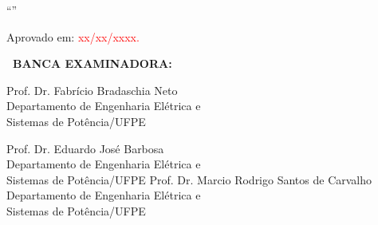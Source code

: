 
\thispagestyle{empty}
\begin{center}


    \textbf{{\ABNTEXchapterfont\fontsize{12}{12}\selectfont\imprimirautor}}
	
    \vspace{0.5cm}
    \begin{center}
      ``\ABNTEXchapterfont\fontsize{12}{12}\selectfont\imprimirtitulo''
    \end{center}
    \vspace{0.5cm}
	

      \hspace{.20\textwidth}
      \begin{minipage}{.55\textwidth}
      	\SingleSpacing
         \imprimirpreambuloatadefesa
       \end{minipage}%
       
    \vspace{0.5cm}
    \begin{flushleft}
    {\fontsize{12}{12}\selectfont Aprovado em: \textcolor{red}{xx/xx/xxxx.} }
    \vspace{0.5cm}
    \\
    {\bfseries\fontsize{12}{12}\selectfont\imprimirorientador\par}
    \vspace{0.5cm}
    {\bfseries\fontsize{12}{12}\selectfont\imprimircoorientador\par}
    \end{flushleft}

     \vspace{1cm}
     
    {\bfseries\fontsize{12}{12}\selectfont\ BANCA EXAMINADORA:}
    
    \vspace{1cm}
    
       
        
		{\SingleSpacing
			Prof. Dr. Fabrício Bradaschia Neto\\
		Departamento de Engenharia Elétrica e \\ Sistemas de Potência/{UFPE}}
        
        \vspace{0.2cm}
        {\SingleSpacing
			Prof. Dr. Eduardo José Barbosa\\
		Departamento de Engenharia Elétrica e \\ Sistemas de Potência/{UFPE}}
  		{\SingleSpacing
			Prof. Dr. Marcio Rodrigo Santos de Carvalho\\
		Departamento de Engenharia Elétrica e \\ Sistemas de Potência/{UFPE}}
        
        \vspace{0.2cm}
	
  \end{center}
  
  
